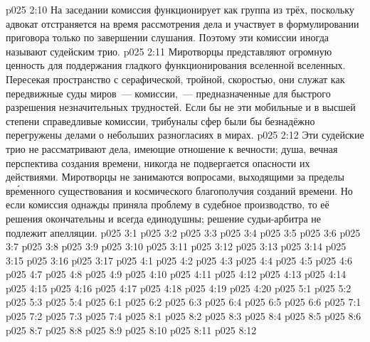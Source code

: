 \vs p025 2:10 \pc На заседании комиссия функционирует как группа из трёх, поскольку адвокат отстраняется на время рассмотрения дела и участвует в формулировании приговора только по завершении слушания. Поэтому эти комиссии иногда называют судейским трио.
\vs p025 2:11 \pc Миротворцы представляют огромную ценность для поддержания гладкого функционирования вселенной вселенных. Пересекая пространство с серафической, тройной, скоростью, они служат как передвижные суды миров~--- комиссии,~--- предназначенные для быстрого разрешения незначительных трудностей. Если бы не эти мобильные и в высшей степени справедливые комиссии, трибуналы сфер были бы безнадёжно перегружены делами о небольших разногласиях в мирах.
\vs p025 2:12 Эти судейские трио не рассматривают дела, имеющие отношение к вечности; душа, вечная перспектива создания времени, никогда не подвергается опасности их действиями. Миротворцы не занимаются вопросами, выходящими за пределы вр\'еменного существования и космического благополучия созданий времени. Но если комиссия однажды приняла проблему в судебное производство, то её решения окончательны и всегда единодушны; решение судьи\hyp{}арбитра не подлежит апелляции.
\vs p025 3:1 
\vs p025 3:2 
\vs p025 3:3 
\vs p025 3:4 
\vs p025 3:5 
\vs p025 3:6 
\vs p025 3:7 
\vs p025 3:8 
\vs p025 3:9 
\vs p025 3:10 
\vs p025 3:11 
\vs p025 3:12 
\vs p025 3:13 
\vs p025 3:14 \pc 
\vs p025 3:15 
\vs p025 3:16 
\vs p025 3:17 
\vs p025 4:1 
\vs p025 4:2 \pc 
\vs p025 4:3 
\vs p025 4:4 
\vs p025 4:5 
\vs p025 4:6 
\vs p025 4:7 
\vs p025 4:8 
\vs p025 4:9 
\vs p025 4:10 \pc 
\vs p025 4:11 
\vs p025 4:12 
\vs p025 4:13 
\vs p025 4:14 \pc 
\vs p025 4:15 
\vs p025 4:16 
\vs p025 4:17 \pc 
\vs p025 4:18 
\vs p025 4:19 
\vs p025 4:20 
\vs p025 5:1 
\vs p025 5:2 
\vs p025 5:3 
\vs p025 5:4 
\vs p025 6:1 
\vs p025 6:2 
\vs p025 6:3 
\vs p025 6:4 
\vs p025 6:5 
\vs p025 6:6 
\vs p025 7:1 
\vs p025 7:2 
\vs p025 7:3 
\vs p025 7:4 
\vs p025 8:1 
\vs p025 8:2 
\vs p025 8:3 
\vs p025 8:4 
\vs p025 8:5 \pc 
\vs p025 8:6 
\vs p025 8:7 
\vs p025 8:8 \pc 
\vs p025 8:9 \pc 
\vs p025 8:10 
\vs p025 8:11 
\vsetoff
\vs p025 8:12 
\quizlink
